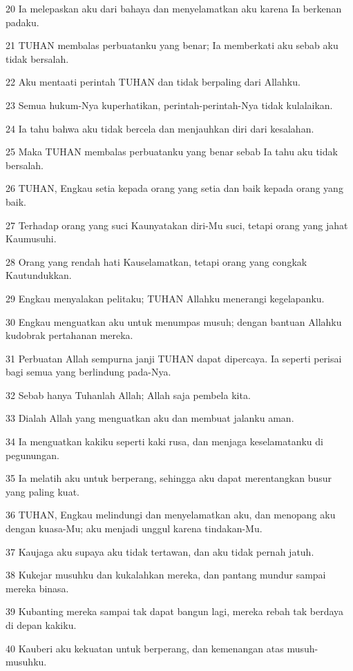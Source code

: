 \par 20 Ia melepaskan aku dari bahaya dan menyelamatkan aku karena Ia berkenan padaku.
\par 21 TUHAN membalas perbuatanku yang benar; Ia memberkati aku sebab aku tidak bersalah.
\par 22 Aku mentaati perintah TUHAN dan tidak berpaling dari Allahku.
\par 23 Semua hukum-Nya kuperhatikan, perintah-perintah-Nya tidak kulalaikan.
\par 24 Ia tahu bahwa aku tidak bercela dan menjauhkan diri dari kesalahan.
\par 25 Maka TUHAN membalas perbuatanku yang benar sebab Ia tahu aku tidak bersalah.
\par 26 TUHAN, Engkau setia kepada orang yang setia dan baik kepada orang yang baik.
\par 27 Terhadap orang yang suci Kaunyatakan diri-Mu suci, tetapi orang yang jahat Kaumusuhi.
\par 28 Orang yang rendah hati Kauselamatkan, tetapi orang yang congkak Kautundukkan.
\par 29 Engkau menyalakan pelitaku; TUHAN Allahku menerangi kegelapanku.
\par 30 Engkau menguatkan aku untuk menumpas musuh; dengan bantuan Allahku kudobrak pertahanan mereka.
\par 31 Perbuatan Allah sempurna janji TUHAN dapat dipercaya. Ia seperti perisai bagi semua yang berlindung pada-Nya.
\par 32 Sebab hanya Tuhanlah Allah; Allah saja pembela kita.
\par 33 Dialah Allah yang menguatkan aku dan membuat jalanku aman.
\par 34 Ia menguatkan kakiku seperti kaki rusa, dan menjaga keselamatanku di pegunungan.
\par 35 Ia melatih aku untuk berperang, sehingga aku dapat merentangkan busur yang paling kuat.
\par 36 TUHAN, Engkau melindungi dan menyelamatkan aku, dan menopang aku dengan kuasa-Mu; aku menjadi unggul karena tindakan-Mu.
\par 37 Kaujaga aku supaya aku tidak tertawan, dan aku tidak pernah jatuh.
\par 38 Kukejar musuhku dan kukalahkan mereka, dan pantang mundur sampai mereka binasa.
\par 39 Kubanting mereka sampai tak dapat bangun lagi, mereka rebah tak berdaya di depan kakiku.
\par 40 Kauberi aku kekuatan untuk berperang, dan kemenangan atas musuh-musuhku.
